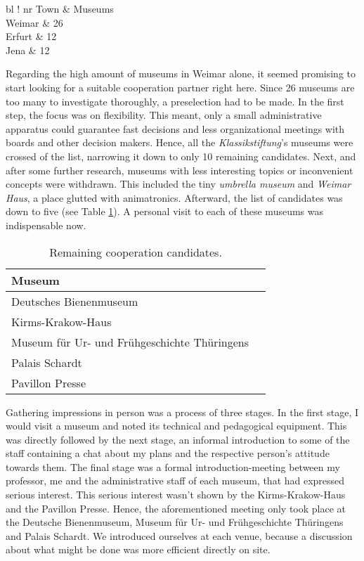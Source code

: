 \begin{table}[h]
	\centering
	\begin{tabular}{ bl !{\vrule width 1pt} nr }
		\rowstyle{\bfseries}
		Town		& Museums \\
		\toprule
		Weimar	& 26 \\ 
		Erfurt 	& 12 \\ 
		Jena 		& 12 \\ 
	\end{tabular}
	\caption{Museums in and around Weimar.}
	\label{tab:museums_amounts}
\end{table}

Regarding the high amount of museums in Weimar alone, it seemed promising to start looking for a suitable cooperation partner right here. Since 26 museums are too many to investigate thoroughly, a preselection had to be made. In the first step, the focus was on flexibility. This meant, only a small administrative apparatus could guarantee fast decisions and less organizational meetings with boards and other decision makers. Hence, all the \textit{Klassikstiftung}'s museums were crossed of the list, narrowing it down to only 10 remaining candidates. Next, and after some further research, museums with less interesting topics or inconvenient concepts were withdrawn. This included the tiny \textit{umbrella museum} and \textit{Weimar Haus}, a place glutted with animatronics. Afterward, the list of candidates was down to five (see Table \ref{tab:museums_finalists}). A personal visit to each of these museums was indispensable now.

\begin{table}[h]
	\centering
	\begin{tabular}{ bl }
		\rowstyle{\bfseries}
		Museum \\
		\toprule
		Deutsches Bienenmuseum \\
		Kirms-Krakow-Haus \\
		Museum für Ur- und Frühgeschichte Thüringens \\ 
		Palais Schardt \\
		Pavillon Presse \\
	\end{tabular}
	\caption{Remaining cooperation candidates.}
	\label{tab:museums_finalists}
\end{table}

Gathering impressions in person was a process of three stages. In the first stage, I would visit a museum and noted its technical and pedagogical equipment. This was directly followed by the next stage, an informal introduction to some of the staff  containing a chat about my plans and the respective person's attitude towards them. The final stage was a formal introduction-meeting between my professor, me and the administrative staff of each museum, that had expressed serious interest. This serious interest wasn't shown by the Kirms-Krakow-Haus and the Pavillon Presse. Hence, the aforementioned meeting only took place at the Deutsche Bienenmuseum, Museum für Ur- und Frühgeschichte Thüringens and Palais Schardt. We introduced ourselves at each venue, because a discussion about what might be done was more efficient directly on site.  

